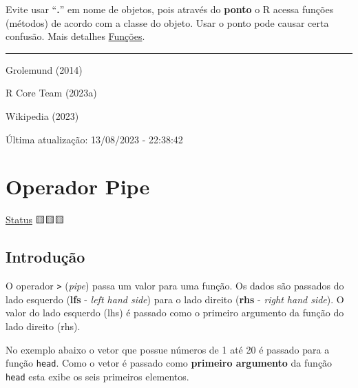 \documentclass[
  letterpaper,
  DIV=11,
  numbers=noendperiod]{scrreprt}
\begin{document}
\begin{tcolorbox}[enhanced jigsaw, bottomtitle=1mm, colframe=quarto-callout-tip-color-frame, coltitle=black, left=2mm, opacitybacktitle=0.6, opacityback=0, breakable, arc=.35mm, titlerule=0mm, title=\textcolor{quarto-callout-tip-color}{\faLightbulb}\hspace{0.5em}{Dica}, colbacktitle=quarto-callout-tip-color!10!white, toptitle=1mm, leftrule=.75mm, bottomrule=.15mm, toprule=.15mm, colback=white, rightrule=.15mm]

Evite usar ``\textbf{.}'' em nome de objetos, pois através do
\textbf{ponto} o R acessa funções (métodos) de acordo com a classe do
objeto. Usar o ponto pode causar certa confusão. Mais detalhes
\protect\hyperlink{funuxe7uxf5es-genuxe9ricas}{Funções}.

\end{tcolorbox}

\begin{center}\rule{0.5\linewidth}{0.5pt}\end{center}

Grolemund (2014)

R Core Team (2023a)

Wikipedia (2023)

Última atualização: 13/08/2023 - 22:38:42

\hypertarget{operador-pipe}{%
\chapter{Operador Pipe}\label{operador-pipe}}

\protect\hyperlink{status-do-material}{Status} 🟨🟨🟨

\hypertarget{introduuxe7uxe3o-1}{%
\section{Introdução}\label{introduuxe7uxe3o-1}}

O operador \texttt{\textbar{}\textgreater{}} (\emph{pipe}) passa um
valor para uma função. Os dados são passados do lado esquerdo
(\textbf{lfs} - \emph{left hand side}) para o lado direito (\textbf{rhs}
- \emph{right hand side}). O valor do lado esquerdo (lhs) é passado como
o primeiro argumento da função do lado direito (rhs).

No exemplo abaixo o vetor que possue números de 1 até 20 é passado para
a função \texttt{head}. Como o vetor é passado como \textbf{primeiro
argumento} da função \texttt{head} esta exibe os seis primeiros
elementos.
\end{document}
